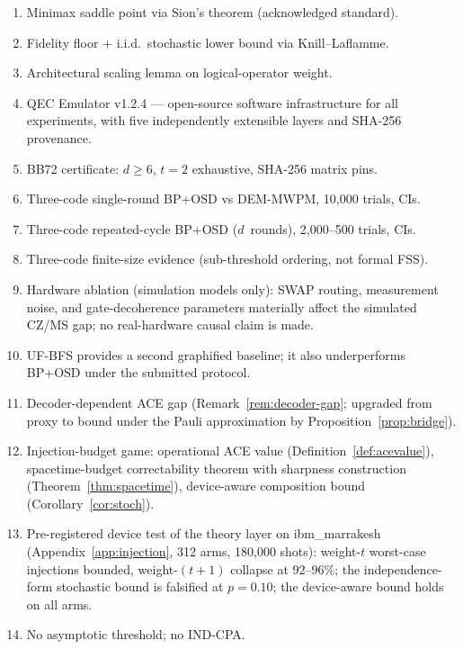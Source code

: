 \documentclass[11pt,a4paper]{article}
\begin{document}
\begin{enumerate}[leftmargin=1.6em,label=(\roman*)]
  \item Minimax saddle point via Sion's theorem (acknowledged standard).
  \item Fidelity floor $+$ i.i.d.\ stochastic lower bound via Knill--Laflamme.
  \item Architectural scaling lemma on logical-operator weight.
  \item QEC Emulator v1.2.4 --- open-source software infrastructure for all
    experiments, with five independently extensible layers and SHA-256 provenance.
  \item BB72 certificate: $d\ge6$, $t=2$ exhaustive, SHA-256 matrix pins.
  \item Three-code single-round BP+OSD vs DEM-MWPM, 10{,}000 trials, CIs.
  \item Three-code repeated-cycle BP+OSD ($d$~rounds), 2{,}000--500 trials, CIs.
  \item Three-code finite-size evidence (sub-threshold ordering, not formal FSS).
  \item Hardware ablation (simulation models only): SWAP routing, measurement noise, and gate-decoherence parameters materially affect the simulated CZ/MS gap; no real-hardware causal claim is made.
  \item UF-BFS provides a second graphified baseline; it also underperforms BP+OSD under the submitted protocol.
  \item Decoder-dependent ACE gap (Remark~\ref{rem:decoder-gap}; upgraded from
    proxy to bound under the Pauli approximation by
    Proposition~\ref{prop:bridge}).
  \item Injection-budget game: operational ACE value
    (Definition~\ref{def:acevalue}), spacetime-budget correctability theorem
    with sharpness construction (Theorem~\ref{thm:spacetime}), device-aware
    composition bound (Corollary~\ref{cor:stoch}).
  \item Pre-registered device test of the theory layer on ibm\_marrakesh
    (Appendix~\ref{app:injection}, 312 arms, 180{,}000 shots): weight-$t$
    worst-case injections bounded, weight-$(t{+}1)$ collapse at
    $92$--$96\%$; the independence-form stochastic bound is falsified at
    $p=0.10$; the device-aware bound holds on all arms.
  \item No asymptotic threshold; no IND-CPA.
\end{enumerate}

\end{document}
